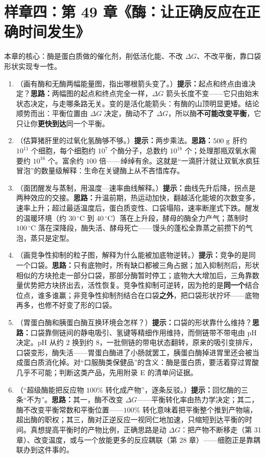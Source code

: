\section{样章四：第 49 章《酶：让正确反应在正确时间发生》}

本章的核心：酶是蛋白质做的催化剂，削低活化能、不改 $\Delta G$、不改平衡，靠口袋形状实现专一性。

\begin{enumerate}[itemsep=3pt]
\item （画有酶和无酶两幅能量图，指出哪根箭头变了。）\textbf{提示：}起点和终点由谁决定？\textbf{思路：}两幅图的起点和终点完全一样，$\Delta G$ 箭头长度不变——它只由始末状态决定，与走哪条路无关。变的是活化能箭头：有酶的山顶明显更矮。结论顺势而出：平衡位置由 $\Delta G$ 决定，酶动不了 $\Delta G$，所以酶\textbf{不可能改变平衡}，它只让你\textbf{更快到达}同一个平衡。
\item （估算猪肝里的过氧化氢酶够不够。）\textbf{提示：}两步乘法。\textbf{思路：}$500\ \mathrm{g}$ 肝约 $10^{11}$ 个细胞，每个细胞约 $10^{7}$ 个酶分子，总数约 $10^{18}$ 个；处理那瓶双氧水需要约 $10^{16}$ 个。富余约 $100$ 倍——绰绰有余。这就是“一滴肝汁就让双氧水疯狂冒泡”的数量级解释：生命在关键酶上从不吝惜库存。
\item （面团醒发与蒸制，用温度—速率曲线解释。）\textbf{提示：}曲线先升后降，拐点是两种效应的交接。\textbf{思路：}升温前期，热运动加快，翻越活化能坡的次数变多，速率上升；超过最适温度后，蛋白质变性、口袋塌陷，速率断崖式下跌。醒发的温暖环境（约 $30\,^{\circ}\mathrm{C}$ 到 $40\,^{\circ}\mathrm{C}$）落在上升段，酵母的酶全力产气；蒸制时 $100\,^{\circ}\mathrm{C}$ 落在深降段，酶失活、酵母死亡——馒头的蓬松全靠蒸之前攒下的气泡，蒸只是定型。
\item （画竞争性抑制的粒子图，解释为什么能被加底物逆转。）\textbf{提示：}竞争的是同一个口袋。\textbf{思路：}只有底物时，所有缺口都被三角占据；加入抑制剂后，形状相似的方块抢走一部分口袋，那部分酶暂时停工；底物大大增加后，三角靠数量优势把方块挤出去，活性恢复。竞争性抑制可逆转，因为抢的是\textbf{同一个}结合位点，谁多谁赢；非竞争性抑制剂结合在口袋\textbf{之外}，把口袋形状拧坏——底物再多，也修不好变了形的口袋。
\item （胃蛋白酶和胰蛋白酶互换环境会怎样？）\textbf{提示：}口袋的形状靠什么维持？\textbf{思路：}口袋靠侧链间的静电吸引、氢键等精细作用维持，而侧链带不带电由 pH 决定。pH 从约 $2$ 换到约 $8$，一批侧链的带电状态翻转，原来的吸引变排斥，口袋变形，酶失活——胃蛋白酶进了小肠就罢工，胰蛋白酶掉进胃里还会被当成蛋白质消化掉。对“口服酶类保健品”的含义：酶是蛋白质，要活着穿过胃酸几乎不可能；判断这类产品，先用附录 E 的清单问证据。
\item （“超级酶能把反应物 $100\%$ 转化成产物”，逐条反驳。）\textbf{提示：}回忆酶的三条“不为”。\textbf{思路：}其一，酶不改变 $\Delta G$——平衡转化率由热力学决定；其二，酶不改变平衡常数和平衡位置——$100\%$ 转化意味着把平衡整个推到产物端，超出酶的职权；其三，酶对正逆反应一视同仁地加速，只缩短到达平衡的时间。真想提高平衡时的产物比例，正确思路是动 $\Delta G$：把产物不断移走（第 31 章）、改变温度，或与一个放能更多的反应耦联（第 28 章）——细胞正是靠耦联办到这件事的。
\end{enumerate}

